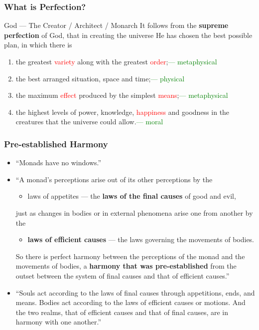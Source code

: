 \documentclass[UTF8,11pt,colorlinks,compress,openany]{beamer}%
\begin{document}
\begin{frame}\frametitle{What is Perfection?}
\begin{block}{God --- The Creator / Architect / Monarch}
It follows from the \textbf{supreme perfection} of God, that in creating the universe He has chosen the best possible plan, in which there is
\begin{enumerate}
\item the greatest \textcolor{red}{variety} along with the greatest \textcolor{red}{order};\hfill \textcolor{green}{--- metaphysical}
\item the best arranged situation, space and time;\hfill \textcolor{green}{--- physical}
\item the maximum \textcolor{red}{effect} produced by the simplest \textcolor{red}{means};\hfill \textcolor{green}{--- metaphysical}
\item the highest levels of power, knowledge, \textcolor{red}{happiness} and goodness in the creatures that the universe could allow.\hfill \textcolor{green}{--- moral}
\end{enumerate}
\end{block}
\end{frame}

\begin{frame}\frametitle{Pre-established Harmony}
\begin{itemize}
	\item ``Monads have no windows.''
	\item ``A monad's perceptions arise out of its other perceptions by the
	\begin{itemize}
		\item laws of appetites --- the \textbf{laws of the final causes} of good and evil,
	\end{itemize}
	just as changes in bodies or in external phenomena arise one from another by the
	\begin{itemize}
		\item \textbf{laws of efficient causes} --- the laws governing the movements of bodies.
	\end{itemize}
	So there is perfect harmony between the perceptions of the monad and the movements of bodies, a \textbf{harmony that was pre-established} from the outset between the system of final causes and that of efficient causes.''
	\item ``Souls act according to the laws of final causes through appetitions, ends, and means. Bodies act according to the laws of efficient causes or motions. And the two realms, that of efficient causes and that of final causes, are in harmony with one another.''
\end{itemize}
\end{frame}
\end{document}
